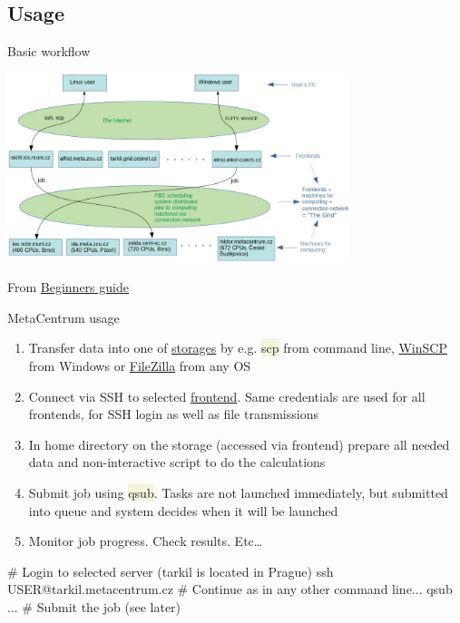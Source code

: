 \documentclass[compress, xelatex, 11pt, xcolor=svgnames, aspectratio=169,
	hyperref={
		bookmarks=true,
		unicode=true,
		colorlinks=true,
		pdftitle={Linux, command line and MetaCentrum},
		plainpages=false,
		pdfauthor={Vojtech Zeisek},
		pdfsubject={Course about use of Linux command line, writing shell scripts and using MetaCentrum of CESNET},
		pdfcreator={XeLaTeX},
		pdfkeywords={Linux, GNU, BASH, shell, command line, MetaCentrum},
		linkcolor=DarkRed, %
		anchorcolor=DarkBlue, %
		citecolor=Indigo, %
		filecolor=NavyBlue, %
		menucolor=DarkMagenta, %
		urlcolor=DarkBlue, %
		},
	url={hyphens, lowtilde} %
	]{beamer}
\renewcommand{\texttt}[1]{\colorbox{Beige}{{\ttfamily #1}}}
\begin{document}
\subsection{Usage}

\begin{frame}{Basic workflow}
	\begin{center}
		\includegraphics[height=5.5cm]{grid_graphics.jpg}
	\end{center}
	\begin{flushright}
		From \href{https://docs.metacentrum.cz/tutorials/}{Beginners guide}
	\end{flushright}
\end{frame}

\begin{frame}[fragile]{MetaCentrum usage}
	\begin{enumerate}
		\item Transfer data into one of \href{https://docs.metacentrum.cz/data/}{storages} by e.g. \texttt{scp} from command line, \href{https://winscp.net/}{WinSCP} from Windows or \href{https://filezilla-project.org/}{FileZilla} from any OS
		\item Connect via SSH to selected \href{https://docs.metacentrum.cz/computing/frontends/}{frontend}. Same credentials are used for all frontends, for SSH login as well as file transmissions
		\item In home directory on the storage (accessed via frontend) prepare all needed data and non-interactive script to do the calculations
		\item Submit job using \texttt{qsub}. Tasks are not launched immediately, but submitted into queue and system decides when it will be launched
		\item Monitor job progress. Check results. Etc\ldots
	\end{enumerate}
	\begin{bashcode}
    # Login to selected server (tarkil is located in Prague)
    ssh USER@tarkil.metacentrum.cz
    # Continue as in any other command line...
    qsub ... # Submit the job (see later)
	\end{bashcode}
\end{frame}
\end{document}

